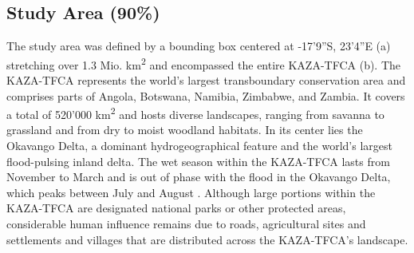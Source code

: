 \documentclass[abstract=on,10pt,a4paper,bibliography=totocnumbered]{article}
\begin{document}
\subsection{Study Area (90\%)}
The study area was defined by a bounding box centered at -17'9''S,
23'4''E (a) stretching over 1.3 Mio.
km\textsuperscript{2} and encompassed the entire KAZA-TFCA (b).
The KAZA-TFCA represents the world's largest transboundary conservation area and
comprises parts of Angola, Botswana, Namibia, Zimbabwe, and Zambia. It covers a
total of 520'000 km\textsuperscript{2} and hosts diverse landscapes, ranging
from savanna to grassland and from dry to moist woodland habitats. In its center
lies the Okavango Delta, a dominant hydrogeographical feature and the world's
largest flood-pulsing inland delta. The wet season within the KAZA-TFCA lasts
from November to March and is out of phase with the flood in the Okavango Delta,
which peaks between July and August \citep{McNutt.1996, Wolski.2017}. Although
large portions within the KAZA-TFCA are designated national parks or other
protected areas, considerable human influence remains due to roads, agricultural
sites and settlements and villages that are distributed across the KAZA-TFCA's
landscape.
\end{document}
